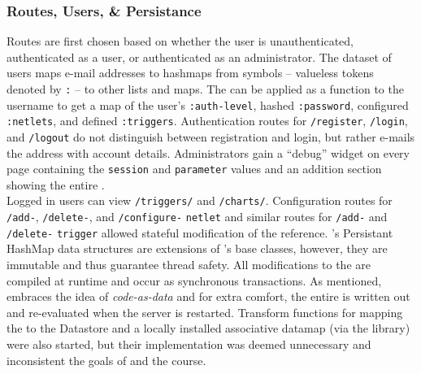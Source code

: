 \subsubsection{Routes, Users, \& Persistance}
Routes are first chosen based on whether the user is unauthenticated, authenticated as a user, or authenticated as an administrator. The dataset of users maps e-mail addresses to hashmaps from \clojure symbols -- valueless tokens denoted by \texttt{:} -- to other lists and maps. The \umap can be applied as a function to the username to get a map of the user's \texttt{:auth-level}, hashed \texttt{:password}, configured \texttt{:netlets}, and defined \texttt{:triggers}.  Authentication routes for \texttt{/register}, \texttt{/login}, and \texttt{/logout} do not distinguish between registration and login, but rather e-mails the address with account details.  Administrators gain a ``debug'' widget on every page containing the \texttt{session} and \texttt{parameter} values and an addition section showing the entire \umap.\\

Logged in users can view \texttt{/triggers/} and \texttt{/charts/}.  Configuration routes for \texttt{/add-}, \texttt{/delete-}, and \texttt{/configure-} \texttt{netlet} and similar routes for \texttt{/add-} and \texttt{/delete-} \texttt{trigger} allowed stateful modification of the \umap reference.  \clojure's Persistant HashMap data structures are extensions of \java's base classes, however, they are immutable and thus guarantee thread safety.  All modifications to the \umap are compiled at runtime and occur as synchronous transactions.  As mentioned, \clojure embraces the idea of \emph{code-as-data} and for extra comfort, the entire \umap is written out and re-evaluated when the server is restarted.  Transform functions for mapping the \umap to the \gae Datastore and a locally installed \mongodb associative datamap (via the \congomongo \clojure library) were also started, but their implementation was deemed unnecessary and inconsistent the goals of \brownengn  and the \coursetitle course.\\

